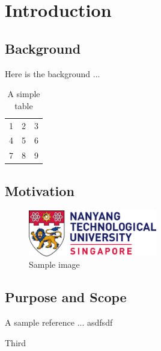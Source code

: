 \chapter{Introduction}
\section{Background}
Here is the background \cite{einstein} ... \\
\begin{table}[h!]
  \begin{center}
    \begin{tabular}{| l c r |}
    \hline
    1 & 2 & 3 \\
    4 & 5 & 6 \\
    7 & 8 & 9 \\
    \hline
    \end{tabular}
  \end{center}
  \caption{A simple table}
\end{table}


\section{Motivation}

\begin{figure}[h!]  
  \centering
    \includegraphics[width=0.5\textwidth]{./figures/ntu_logo.png}
  \caption{Sample image}
\end{figure}

\section{Purpose and Scope}
A sample reference \cite{latexcompanion} ... asdfsdf \par

Third \cite{knuthwebsite}

